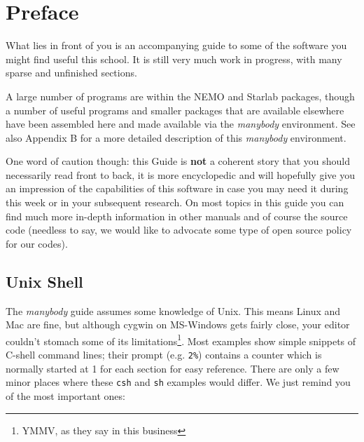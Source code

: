 \chapter*{Preface}

What lies in front of you is an accompanying guide to some of 
the software you might find useful this school.
It is still very much work in progress, with many sparse and
unfinished sections.


A large number of programs are within the NEMO and Starlab packages, 
though a number of useful programs and smaller packages
that are available elsewhere have been assembled here
and made available via the {\it manybody} environment.
See also Appendix B for a more detailed description of this
{\it manybody} environment.

One word of caution though: this Guide is {\bf not} a coherent
story that you should necessarily read front to back, it is more encyclopedic
and will hopefully give you an impression of the capabilities
of this software in case you may need it during this week or in
your subsequent research. On most topics in this guide you can find
much more in-depth information in other manuals and of course 
the source code (needless to say, we would like to advocate some
type of open source policy for our codes).

%

\section*{Unix Shell}

The {\it manybody} guide assumes some knowledge
of Unix. This means Linux and Mac are fine, but although cygwin on MS-Windows
gets fairly close, your editor couldn't stomach some of 
its limitations\footnote{YMMV, as they say in this business}.
Most examples show simple snippets
of C-shell command lines; their prompt (e.g. \verb+2%+) 
contains a counter which is normally started at 1 for each section
for easy reference.
There are only a few minor places where these {\tt csh} and 
{\tt sh} examples would differ. We just remind you of
the most important ones:


